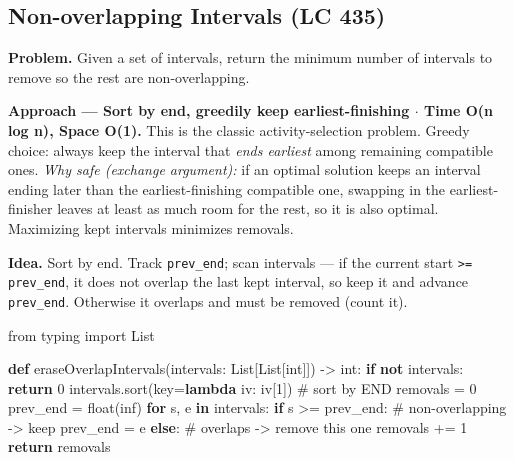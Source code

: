 \documentclass[11pt]{article}
\newenvironment{Shaded}{\begin{snugshade}}{\end{snugshade}}
\newcommand{\BuiltInTok}[1]{\textcolor[rgb]{0.50,0.55,0.55}{#1}}
\newcommand{\CommentTok}[1]{\textcolor[rgb]{0.48,0.49,0.49}{#1}}
\newcommand{\ControlFlowTok}[1]{\textcolor[rgb]{0.99,0.74,0.29}{\textbf{#1}}}
\newcommand{\DecValTok}[1]{\textcolor[rgb]{0.96,0.45,0.00}{#1}}
\newcommand{\ImportTok}[1]{\textcolor[rgb]{0.15,0.68,0.38}{#1}}
\newcommand{\KeywordTok}[1]{\textcolor[rgb]{0.81,0.81,0.76}{\textbf{#1}}}
\newcommand{\NormalTok}[1]{\textcolor[rgb]{0.81,0.81,0.76}{#1}}
\newcommand{\OperatorTok}[1]{\textcolor[rgb]{0.81,0.81,0.76}{#1}}
\newcommand{\RegionMarkerTok}[1]{\textcolor[rgb]{0.16,0.50,0.73}{\colorbox[rgb]{0.08,0.19,0.26}{#1}}}
\newcommand{\StringTok}[1]{\textcolor[rgb]{0.96,0.31,0.31}{#1}}
\begin{document}
\subsection{Non-overlapping Intervals (LC 435)}\label{non-overlapping-intervals-lc-435}

\textbf{Problem.} Given a set of intervals, return the minimum number of intervals to remove so the rest are non-overlapping.

\textbf{Approach --- Sort by end, greedily keep earliest-finishing \(\cdot\) Time O(n log n), Space O(1).} This is the classic activity-selection problem. Greedy choice: always keep the interval that \emph{ends earliest} among remaining compatible ones. \emph{Why safe (exchange argument):} if an optimal solution keeps an interval ending later than the earliest-finishing compatible one, swapping in the earliest-finisher leaves at least as much room for the rest, so it is also optimal. Maximizing kept intervals minimizes removals.

\textbf{Idea.} Sort by end. Track \texttt{prev\_end}; scan intervals --- if the current start \texttt{\textgreater{}=} \texttt{prev\_end}, it does not overlap the last kept interval, so keep it and advance \texttt{prev\_end}. Otherwise it overlaps and must be removed (count it).


\begin{Shaded}
\begin{Highlighting}[]
\ImportTok{from}\NormalTok{ typing }\ImportTok{import}\NormalTok{ List}

\KeywordTok{def}\NormalTok{ eraseOverlapIntervals(intervals: List[List[}\BuiltInTok{int}\NormalTok{]]) }\OperatorTok{{-}\textgreater{}} \BuiltInTok{int}\NormalTok{:}
    \ControlFlowTok{if} \KeywordTok{not}\NormalTok{ intervals:}
        \ControlFlowTok{return} \DecValTok{0}
\NormalTok{    intervals.sort(key}\OperatorTok{=}\KeywordTok{lambda}\NormalTok{ iv: iv[}\DecValTok{1}\NormalTok{])     }\CommentTok{\# sort by }\RegionMarkerTok{END}
\NormalTok{    removals }\OperatorTok{=} \DecValTok{0}
\NormalTok{    prev\_end }\OperatorTok{=} \BuiltInTok{float}\NormalTok{(}\StringTok{\textquotesingle{}{-}inf\textquotesingle{}}\NormalTok{)}
    \ControlFlowTok{for}\NormalTok{ s, e }\KeywordTok{in}\NormalTok{ intervals:}
        \ControlFlowTok{if}\NormalTok{ s }\OperatorTok{\textgreater{}=}\NormalTok{ prev\_end:                    }\CommentTok{\# non{-}overlapping {-}\textgreater{} keep}
\NormalTok{            prev\_end }\OperatorTok{=}\NormalTok{ e}
        \ControlFlowTok{else}\NormalTok{:                                }\CommentTok{\# overlaps {-}\textgreater{} remove this one}
\NormalTok{            removals }\OperatorTok{+=} \DecValTok{1}
    \ControlFlowTok{return}\NormalTok{ removals}
\end{Highlighting}
\end{Shaded}
\end{document}
